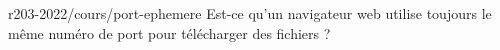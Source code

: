 \begin{question}{r203-2022/cours/port-ephemere}
  Est-ce qu'un navigateur web utilise toujours le même numéro de port
  pour télécharger des fichiers ?
  \begin{reponses}
  \end{reponses}
\end{question}
